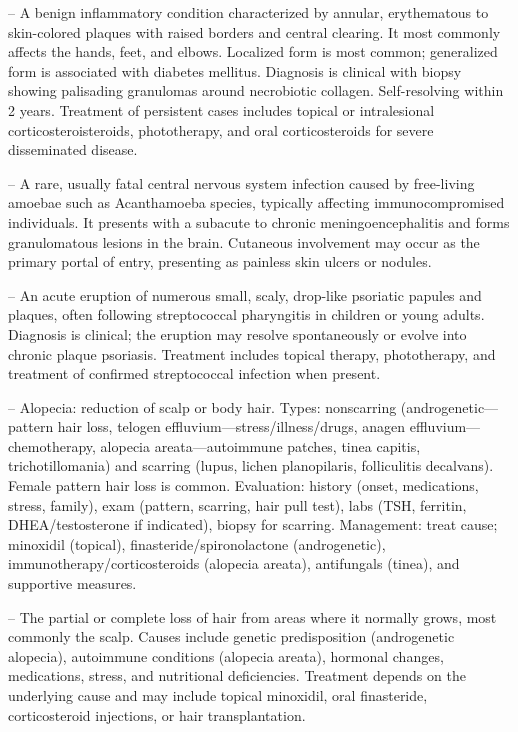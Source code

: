 -- A benign inflammatory condition characterized by annular, erythematous to skin-colored plaques with raised borders and central clearing. It most commonly affects the hands, feet, and elbows. Localized form is most common; generalized form is associated with diabetes mellitus. Diagnosis is clinical with biopsy showing palisading granulomas around necrobiotic collagen. Self-resolving within 2 years. Treatment of persistent cases includes topical or intralesional corticosteroisteroids, phototherapy, and oral corticosteroids for severe disseminated disease.

-- A rare, usually fatal central nervous system infection caused by free-living amoebae such as Acanthamoeba species, typically affecting immunocompromised individuals. It presents with a subacute to chronic meningoencephalitis and forms granulomatous lesions in the brain. Cutaneous involvement may occur as the primary portal of entry, presenting as painless skin ulcers or nodules.

-- An acute eruption of numerous small, scaly, drop-like psoriatic papules and plaques, often following streptococcal pharyngitis in children or young adults. Diagnosis is clinical; the eruption may resolve spontaneously or evolve into chronic plaque psoriasis. Treatment includes topical therapy, phototherapy, and treatment of confirmed streptococcal infection when present.

-- Alopecia: reduction of scalp or body hair. Types: nonscarring (androgenetic—pattern hair loss, telogen effluvium—stress/illness/drugs, anagen effluvium—chemotherapy, alopecia areata—autoimmune patches, tinea capitis, trichotillomania) and scarring (lupus, lichen planopilaris, folliculitis decalvans). Female pattern hair loss is common. Evaluation: history (onset, medications, stress, family), exam (pattern, scarring, hair pull test), labs (TSH, ferritin, DHEA/testosterone if indicated), biopsy for scarring. Management: treat cause; minoxidil (topical), finasteride/spironolactone (androgenetic), immunotherapy/corticosteroids (alopecia areata), antifungals (tinea), and supportive measures.

-- The partial or complete loss of hair from areas where it normally grows, most commonly the scalp. Causes include genetic predisposition (androgenetic alopecia), autoimmune conditions (alopecia areata), hormonal changes, medications, stress, and nutritional deficiencies. Treatment depends on the underlying cause and may include topical minoxidil, oral finasteride, corticosteroid injections, or hair transplantation.

